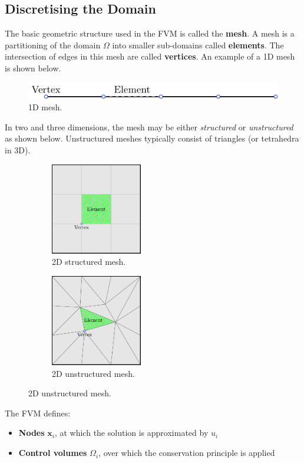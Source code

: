 \documentclass{article}
\begin{document}
\subsection{Discretising the Domain}
The basic geometric structure used in the FVM is called the
\textbf{mesh}. A mesh is a partitioning of the domain \(\Omega\) into
smaller sub-domains called \textbf{elements}. The intersection of edges
in this mesh are called \textbf{vertices}. An example of a 1D mesh is
shown below.
\begin{figure}[H]
    \centering
    \includegraphics[width = 0.8\linewidth]{figures/1d-mesh.pdf}
    \caption{1D mesh.} %
\end{figure}
In two and three dimensions, the mesh may be either \textit{structured}
or \textit{unstructured} as shown below. Unstructured meshes typically
consist of triangles (or tetrahedra in 3D).
\begin{figure}[H]
    \centering
    \begin{subfigure}[t]{0.45\textwidth}
        \centering
        \includegraphics[height = 4cm]{figures/2d-structured-mesh.pdf}
        \caption{2D structured mesh.} %
    \end{subfigure}
    \begin{subfigure}[t]{0.45\textwidth}
        \centering
        \includegraphics[height = 4cm]{figures/2d-unstructured-mesh.pdf}
        \caption{2D unstructured mesh.} %
    \end{subfigure}
\end{figure}
The FVM defines:
\begin{itemize}
    \item \textbf{Nodes} \(\symbf{x}_i\), at which the solution is
          approximated by \(u_i\)
    \item \textbf{Control volumes} \(\Omega_i\), over which the
          conservation principle is applied
\end{itemize}
\end{document}
